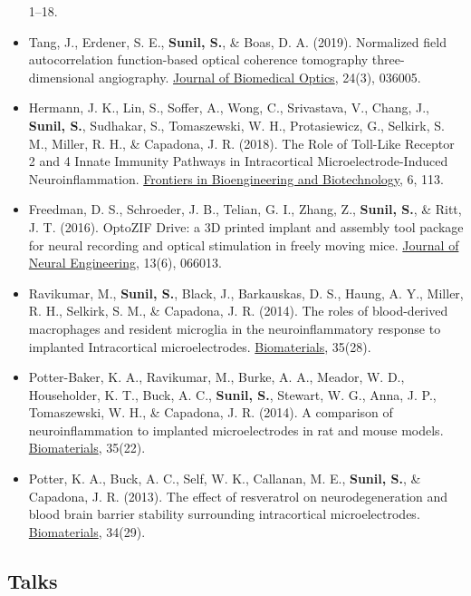 \documentclass[
  letterpaper,
  DIV=11,
  numbers=noendperiod]{scrartcl}
\begin{document}
\begin{itemize}
  1--18.
\item
  Tang, J., Erdener, S. E., \textbf{Sunil, S.}, \& Boas, D. A. (2019).
  Normalized field autocorrelation function-based optical coherence
  tomography three-dimensional angiography.
  \href{https://doi.org/10.1117/1.JBO.24.3.036005}{Journal of Biomedical
  Optics}, 24(3), 036005.
\item
  Hermann, J. K., Lin, S., Soffer, A., Wong, C., Srivastava, V., Chang,
  J., \textbf{Sunil, S.}, Sudhakar, S., Tomaszewski, W. H.,
  Protasiewicz, G., Selkirk, S. M., Miller, R. H., \& Capadona, J. R.
  (2018). The Role of Toll-Like Receptor 2 and 4 Innate Immunity
  Pathways in Intracortical Microelectrode-Induced Neuroinflammation.
  \href{https://doi.org/10.3389/fbioe.2018.00113}{Frontiers in
  Bioengineering and Biotechnology}, 6, 113.
\item
  Freedman, D. S., Schroeder, J. B., Telian, G. I., Zhang, Z.,
  \textbf{Sunil, S.}, \& Ritt, J. T. (2016). OptoZIF Drive: a 3D printed
  implant and assembly tool package for neural recording and optical
  stimulation in freely moving mice.
  \href{https://doi.org/10.1088/1741-2560/13/6/066013}{Journal of Neural
  Engineering}, 13(6), 066013.
\item
  Ravikumar, M., \textbf{Sunil, S.}, Black, J., Barkauskas, D. S.,
  Haung, A. Y., Miller, R. H., Selkirk, S. M., \& Capadona, J. R.
  (2014). The roles of blood-derived macrophages and resident microglia
  in the neuroinflammatory response to implanted Intracortical
  microelectrodes.
  \href{https://doi.org/10.1016/j.biomaterials.2014.05.084}{Biomaterials},
  35(28).
\item
  Potter-Baker, K. A., Ravikumar, M., Burke, A. A., Meador, W. D.,
  Householder, K. T., Buck, A. C., \textbf{Sunil, S.}, Stewart, W. G.,
  Anna, J. P., Tomaszewski, W. H., \& Capadona, J. R. (2014). A
  comparison of neuroinflammation to implanted microelectrodes in rat
  and mouse models.
  \href{https://doi.org/10.1016/j.biomaterials.2014.03.076}{Biomaterials},
  35(22).
\item
  Potter, K. A., Buck, A. C., Self, W. K., Callanan, M. E.,
  \textbf{Sunil, S.}, \& Capadona, J. R. (2013). The effect of
  resveratrol on neurodegeneration and blood brain barrier stability
  surrounding intracortical microelectrodes.
  \href{https://doi.org/10.1016/j.biomaterials.2013.05.035}{Biomaterials},
  34(29).
\end{itemize}

\hypertarget{talks}{%
\subsection{Talks}\label{talks}}
\end{document}
